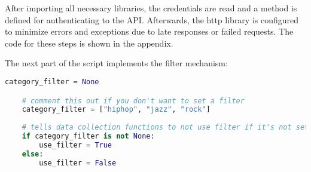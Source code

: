%
%   
%    
%    
%    
%    
%    
%
%

After importing all necessary libraries, the credentials are read and a method is defined for authenticating to the API.
Afterwards, the http library is configured to minimize errors and exceptions due to late responses or failed requests.
The code for these steps is shown in the appendix.

The next part of the script implements the filter mechanism:

\begin{lstlisting}[language=Python]
    category_filter = None

    # comment this out if you don't want to set a filter
    category_filter = ["hiphop", "jazz", "rock"]
    
    # tells data collection functions to not use filter if it's not set
    if category_filter is not None:
        use_filter = True
    else:
        use_filter = False
\end{lstlisting} 

